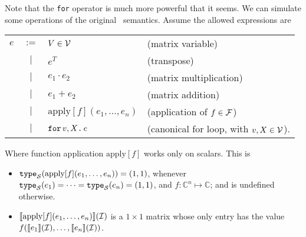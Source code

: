 
\medskip

Note that the  \texttt{for} operator is much more powerful that it seems. We can simulate some operations of the original \lang\ semantics. Assume the allowed expressions are

\begin{tabular}{lcll}
$e$ & $:=$ & $V\in \mathcal{V}$ & (matrix variable)\\
 & $|$ & $e^T$ & (transpose)\\ 
 & $|$ & $e_1 \cdot e_2$ & (matrix multiplication)\\   
 & $|$ & $e_1 + e_2$ & (matrix addition)\\    
 & $|$ & $\text{apply}[f](e_1,\ldots ,e_n)$ & (application of $f\in \mathcal{F}$)\\
 & $|$ & $\texttt{for}\, v,X \texttt{.}\, e$ & (canonical for loop, with $v, X \in \mathcal{V}$). 
\end{tabular}

Where function application $\text{apply}[f]$ works only on scalars. This is 

\begin{itemize}
\item $\texttt{type}_{\mathcal{S}}(\text{apply}[f](e_1,\ldots ,e_n)) = (1,1)$, whenever $\texttt{type}_{\mathcal{S}}(e_1)= \cdots =\texttt{type}_{\mathcal{S}}(e_n)=(1,1)$, and $f:\mathbb{C}^n\mapsto \mathbb{C}$; and is undefined otherwise.
\item $\llbracket \text{apply}[f](e_1,\ldots ,e_n) \rrbracket(\mathcal{I})$ is a $1\times 1$ matrix whose only entry has the value $f(\llbracket e_1 \rrbracket(\mathcal{I}),\ldots ,\llbracket e_n \rrbracket(\mathcal{I}))$.
\end{itemize}

